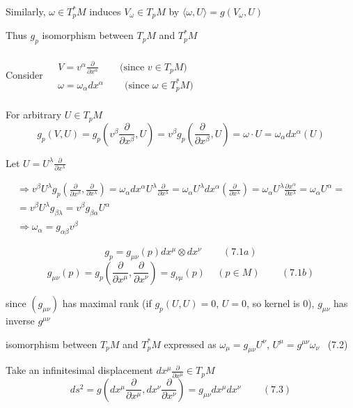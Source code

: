 \documentclass{book}
\begin{document}
Similarly, $\omega \in T_p^*M$ induces $V_{\omega} \in T_pM$ by $\langle \omega, U \rangle = g(V_{\omega}, U)$ 

Thus $g_p$ isomorphism between $T_pM$ and $T_p^*M$

Consider $\begin{aligned} & \quad \\ 
  & V = v^{\alpha} \frac{ \partial }{ \partial x^{\alpha }} \quad \quad \, \text{(since $v \in T_pM$)} \\
  & \omega = \omega_{\alpha} dx^{\alpha} \quad \quad \, \text{(since $\omega \in T^*_pM$)} \\
\end{aligned}$

For arbitrary $U \in T_p M$
\[
g_p(V,U) = g_p( v^{\beta} \frac{ \partial }{ \partial x^{\beta} }, U ) = v^{\beta} g_p\left( \frac{ \partial }{ \partial x^{\beta} }, U \right) = \omega \cdot U  = \omega_{\alpha}dx^{\alpha}(U) 
\]

Let $U = U^{\lambda} \frac{ \partial }{ \partial x^{\lambda }}$

\[
\begin{gathered}
  \Longrightarrow v^{\beta} U^{\lambda} g_p\left( \frac{  \partial }{ \partial x^{\beta} }, \frac{ \partial }{ \partial x^{\lambda} } \right) = \omega_{\alpha} dx^{\alpha} U^{\lambda} \frac{ \partial }{ \partial x^{\lambda }} = \omega_{\alpha} U^{\lambda} dx^{\alpha} \left( \frac{ \partial }{ \partial x^{\lambda }} \right) = \omega_{\alpha} U^{\lambda} \frac{ \partial x^{\alpha }}{ \partial x^{\lambda }} = \omega_{\alpha} U^{\alpha } = \\
  = v^{\beta} U^{\lambda} g_{\beta \lambda} = v^{\beta} g_{\beta \alpha } U^{\alpha } \\
  \Longrightarrow \omega_{\alpha} = g_{\alpha \beta} v^{\beta}
\end{gathered}
\]

\[
g_p = g_{\mu \nu}(p) dx^{\mu} \otimes dx^{\nu} \quad \quad \, (7.1a)
\]
\[
g_{\mu \nu}(p) = g_p \left( \frac{ \partial }{ \partial x^{\mu }} , \frac{ \partial }{ \partial x^{\nu }} \right) = g_{\nu \mu}(p) \quad \, (p \in M) \quad \quad \, (7.1b)
\]

since $(g_{\mu \nu})$ has maximal rank (if $g_p(U,U) = 0$, $U=0$, so kernel is $0$), $g_{\mu \nu}$ has inverse $g^{\mu \nu}$

isomorphism between $T_p M$ and $T_p^*M$ expressed as $\omega_{\mu} = g_{\mu \nu} U^{\nu}$, $U^{\mu} = g^{\mu \nu} \omega_{\nu}$ \quad \, (7.2)

Take an infinitesimal displacement $dx^{\mu} \frac{ \partial }{ \partial x^{\mu} } \in T_p M$ 
\[
ds^2 = g \left( dx^{\mu} \frac{ \partial }{ \partial x^{\mu} }, dx^{\nu} \frac{ \partial }{ \partial x^{\nu} }\right) = g_{\mu \nu} dx^{\mu} dx^{\nu} \quad \quad \, (7.3)
\]
\end{document}
